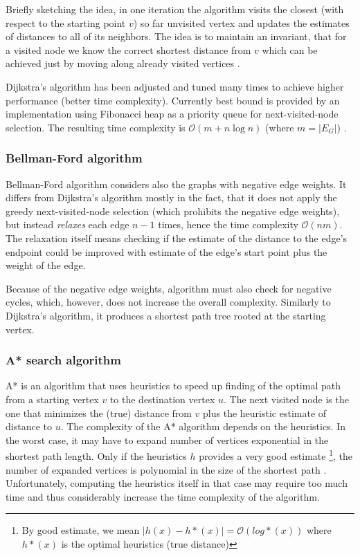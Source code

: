 \documentclass[a4paper]{article}
\begin{document}
            Briefly sketching the idea, in one iteration the algorithm visits the closest (with respect to the starting point $v$) so far unvisited vertex and updates the estimates of distances to all of its neighbors. The idea is to maintain an invariant, that for a visited node we know the correct shortest distance from $v$ which can be achieved just by moving along already visited vertices \cite{Tea97}.

            Dijkstra's algorithm has been adjusted and tuned many times to achieve higher performance (better time complexity). Currently best bound is provided by an implementation using Fibonacci heap as a priority queue for next-visited-node selection. The resulting time complexity is $\mathcal{O}(m + n\log n)$ (where $m=|E_{G}|$) \cite{sommerthesis10}.

            \subsubsection{Bellman-Ford algorithm}
            Bellman-Ford algorithm considers also the graphs with negative edge weights. It differs from Dijkstra's algorithm mostly in the fact, that it does not apply the greedy next-visited-node selection (which prohibits the negative edge weights), but instead \emph{relaxes} each edge $n - 1$ times, hence the time complexity $\mathcal{O}(n m)$. The relaxation itself means checking if the estimate of the distance to the edge's endpoint could be improved with estimate of the edge's start point plus the weight of the edge.

            Because of the negative edge weights, algorithm must also check for negative cycles, which, however, does not increase the overall complexity. Similarly to Dijkstra's algorithm, it produces a shortest path tree rooted at the starting vertex.

            \subsubsection{A* search algorithm}
            A* is an algorithm that uses heuristics to speed up finding of the optimal path from a starting vertex $v$ to the destination vertex $u$. The next visited node is the one that minimizes the (true) distance from $v$ plus the heuristic estimate of distance to $u$. The complexity of the A* algorithm depends on the heuristics. In the worst case, it may have to expand number of vertices exponential in the shortest path length. Only if the heuristics $h$ provides a very good estimate \footnote{By good estimate, we mean $|h(x) - h*(x)| = \mathcal{O}(log*(x))$ where $h*(x)$ is the optimal heuristics (true distance)}, the number of expanded vertices is polynomial in the size of the shortest path \cite{zuiprednaska}. Unfortunately, computing the heuristics itself in that case may require too much time and thus considerably increase the time complexity of the algorithm.
\end{document}
